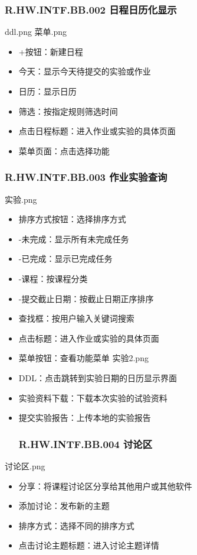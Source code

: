 \begin{enumerate}
    \subsubsection{R.HW.INTF.BB.002 日程日历化显示}
    ddl.png
    菜单.png
    \begin{itemize}
  \item +按钮：新建日程
  \item 今天：显示今天待提交的实验或作业
  \item 日历：显示日历
  \item 筛选：按指定规则筛选时间
  \item 点击日程标题：进入作业或实验的具体页面
  \item 菜单页面：点击选择功能
  \end{itemize}
    \subsubsection{R.HW.INTF.BB.003 作业实验查询}
    实验.png
    \begin{itemize}
  \item  排序方式按钮：选择排序方式
  \item -未完成：显示所有未完成任务
  \item -已完成：显示已完成任务
  \item -课程：按课程分类
  \item -提交截止日期：按截止日期正序排序
  \item 查找框：按用户输入关键词搜索
  \item 点击标题：进入作业或实验的具体页面
  \item 菜单按钮：查看功能菜单
  实验2.png
  \item DDL：点击跳转到实验日期的日历显示界面
  \item 实验资料下载：下载本次实验的试验资料
  \item 提交实验报告：上传本地的实验报告
    \subsubsection{R.HW.INTF.BB.004 讨论区}
    \end{itemize}
    讨论区.png
    \begin{itemize}
  \item 分享：将课程讨论区分享给其他用户或其他软件
  \item 添加讨论：发布新的主题
  \item 排序方式：选择不同的排序方式
  \item 点击讨论主题标题：进入讨论主题详情
  \end{itemize}

\end{enumerate}
